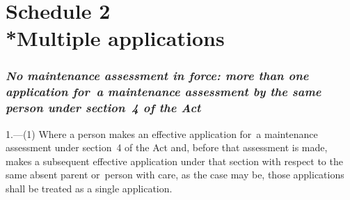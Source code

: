 \documentclass[a4paper,12pt]{article}
\begin{document}
\part[Schedule 2 --- Multiple applications]{Schedule 2\\*Multiple applications}

\renewcommand\parthead{--- Schedule 2}

\section*{\itshape No maintenance assessment in force: more than one application for~a maintenance assessment by the same person under section~4 
of the Act}

1.—(1) Where a person makes an effective application for~a maintenance assessment under section~4 
of the Act and, before that assessment is made, makes a subsequent effective application under that section with respect to the same absent parent or~person with care, as the case may be, those applications shall be treated as a single application.

%
%

\end{document}
